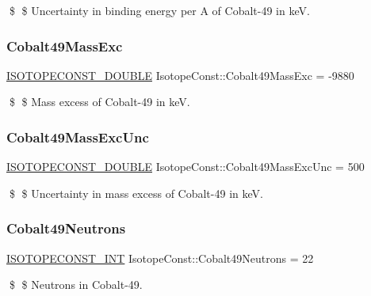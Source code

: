 \$ \$ Uncertainty in binding energy per A of Cobalt-\/49 in keV. \mbox{\label{group___isotope_const-_cobalt-_co49_ga79b1d27378fefcbbcd8511824fa15691}} 
\subsubsection{\texorpdfstring{Cobalt49\+Mass\+Exc}{Cobalt49MassExc}}
{\footnotesize\ttfamily \mbox{\hyperlink{group___isotope_const-_macros_ga8f45a7272ce02c0b4c65c44636ed719a}{I\+S\+O\+T\+O\+P\+E\+C\+O\+N\+S\+T\+\_\+\+D\+O\+U\+B\+LE}} Isotope\+Const\+::\+Cobalt49\+Mass\+Exc = -\/9880}

\$ \$ Mass excess of Cobalt-\/49 in keV. \mbox{\label{group___isotope_const-_cobalt-_co49_ga33e676344315599059c8c328035aeb18}} 
\subsubsection{\texorpdfstring{Cobalt49\+Mass\+Exc\+Unc}{Cobalt49MassExcUnc}}
{\footnotesize\ttfamily \mbox{\hyperlink{group___isotope_const-_macros_ga8f45a7272ce02c0b4c65c44636ed719a}{I\+S\+O\+T\+O\+P\+E\+C\+O\+N\+S\+T\+\_\+\+D\+O\+U\+B\+LE}} Isotope\+Const\+::\+Cobalt49\+Mass\+Exc\+Unc = 500}

\$ \$ Uncertainty in mass excess of Cobalt-\/49 in keV. \mbox{\label{group___isotope_const-_cobalt-_co49_gaac2d5960ed1d52ea64ca668153d8918d}} 
\subsubsection{\texorpdfstring{Cobalt49\+Neutrons}{Cobalt49Neutrons}}
{\footnotesize\ttfamily \mbox{\hyperlink{group___isotope_const-_macros_ga5f18360b3e99483a35c32d789e62621c}{I\+S\+O\+T\+O\+P\+E\+C\+O\+N\+S\+T\+\_\+\+I\+NT}} Isotope\+Const\+::\+Cobalt49\+Neutrons = 22}

\$ \$ Neutrons in Cobalt-\/49. \mbox{\label{group___isotope_const-_cobalt-_co49_ga9f82733183208f19dfdb1ae45bd5ec80}} 
